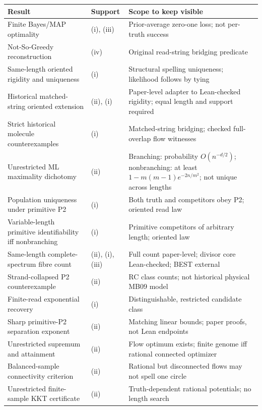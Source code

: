 \begin{table}[htbp]
\centering\small
\renewcommand{\arraystretch}{1.05}
\begin{tabular}{@{}p{}p{}p{}@{}}
\toprule
Result & Support & Scope to keep visible \\
\midrule
Finite Bayes/MAP optimality & (i), (iii) & Prior-average zero-one loss; not per-truth success \\
Not-So-Greedy reconstruction & (iv) & Original read-string bridging predicate \\
Same-length oriented rigidity and uniqueness & (i) & Structural spelling uniqueness; likelihood follows by tying \\
Historical matched-string oriented extension & (ii), (i) & Paper-level adapter to Lean-checked rigidity; equal length and support required \\
Strict historical molecule counterexamples & (i) & Matched-string bridging; checked full-overlap flow witnesses \\
Unrestricted ML maximality dichotomy & (ii) & Branching: probability $O(n^{-d/2})$; nonbranching: at least $1-m(m-1)e^{-2n/m^2}$; not unique across lengths \\
Population uniqueness under primitive P2 & (i) & Both truth and competitors obey P2; oriented read law \\
Variable-length primitive identifiability iff nonbranching & (i) & Primitive competitors of arbitrary length; oriented law \\
Same-length complete-spectrum fibre count & (ii), (i), (iii) & Full count paper-level; divisor core Lean-checked; BEST external \\
Strand-collapsed P2 counterexample & (ii) & RC class counts; not historical physical MB09 model \\
Finite-read exponential recovery & (i) & Distinguishable, restricted candidate class \\
Sharp primitive-P2 separation exponent & (ii) & Matching linear bounds; paper proofs, not Lean endpoints \\
Unrestricted supremum and attainment & (ii) & Flow optimum exists; finite genome iff rational connected optimizer \\
Balanced-sample connectivity criterion & (ii) & Rational but disconnected flows may not spell one circle \\
Unrestricted finite-sample KKT certificate & (ii) & Truth-dependent rational potentials; no length search \\

\end{tabular}
\end{table}
